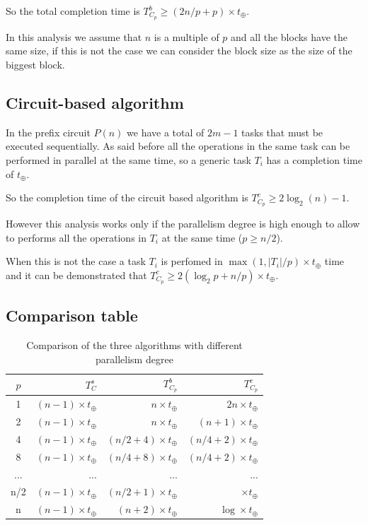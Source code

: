 \documentclass{article}
\begin{document}
So the total completion time is $T^{b}_{C_p} \geq (2n/p + p) \times t_{\oplus}$.

\smallskip

In this analysis we assume that $n$ is a multiple of $p$ and all the blocks have the same size, if this is not the case we can consider the block size as the size of the biggest block.

\subsection{Circuit-based algorithm}

In the prefix circuit $P(n)$ we have a total of $2m-1$ tasks that must be executed sequentially. 
As said before all the operations in the same task can be performed in parallel at the same time, so a generic task $T_i$ has a completion time of $t_{\oplus}$.

So the completion time of the circuit based algorithm is $T^{c}_{C_p} \geq 2\log_{2}(n) - 1$.

\smallskip

However this analysis works only if the parallelism degree is high enough to allow to performs all the operations in $T_i$ at the same time ($p \geq n/2$).

\smallskip

When this is not the case a task $T_i$ is perfomed in $\max(1, |T_i|/p) \times t_\oplus$ time and it can be demonstrated that $T^{c}_{C_p} \geq 2(\log_2{p} + n/p) \times t_{\oplus}$.

\subsection{Comparison table}

\begin{table}[h]
\centering
\begin{tabular}{|c|r|r|r|}
\hline
 $p$ & $T^s_{C}$                & $T^b_{C_p}$                   & $T^c_{C_p}$ \\ \hline
  1  & $(n-1)\times t_{\oplus}$ & $n \times t_{\oplus}$         & $2n \times t_{\oplus}$\\ \hline
  2  & $(n-1)\times t_{\oplus}$ & $n \times t_{\oplus}$         & $(n+1) \times t_{\oplus}$ \\ \hline
  4  & $(n-1)\times t_{\oplus}$ & $(n/2 + 4) \times t_{\oplus}$ & $(n/4+2) \times t_{\oplus}$ \\ \hline
  8  & $(n-1)\times t_{\oplus}$ & $(n/4 + 8) \times t_{\oplus}$ & $(n/4+2) \times t_{\oplus}$ \\ \hline
 ... & ...                      & ...                           & ... \\ \hline
 n/2 & $(n-1)\times t_{\oplus}$ & $(n/2+1)\times t_{\oplus}$    & $ \times t_{\oplus}$ \\ \hline
  n  & $(n-1)\times t_{\oplus}$ & $(n+2)\times t_{\oplus}$      & $\log \times t_{\oplus}$ \\ \hline
\end{tabular}
\caption{Comparison of the three algorithms with different parallelism degree}
\end{table}
\end{document}
